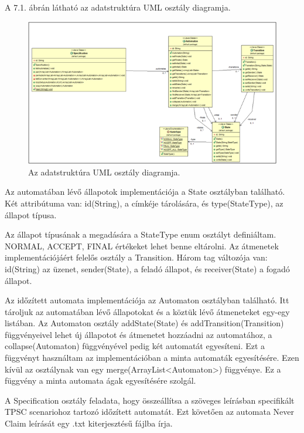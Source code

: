 A 7.1. ábrán látható az adatstruktúra UML osztály diagramja.

\begin{figure}[h!]
    \centering
    \includegraphics[width=150mm, keepaspectratio]{figures/13abra.png}
    \caption{Az adatstruktúra UML osztály diagramja.}
\end{figure}

Az automatában lévő állapotok implementációja a State osztályban található.
Két attribútuma van: id(String), a címkéje tárolására, és type(StateType), az állapot típusa.

Az állapot típusának a megadására a StateType enum osztályt definiáltam.
NORMAL, ACCEPT, FINAL értékeket lehet benne eltárolni.
Az átmenetek implementációjáért felelős osztály a Transition.
Három tag változója van: id(String) az üzenet, sender(State), a feladó állapot, és receiver(State) a fogadó állapot.

Az időzített automata implementációja az Automaton osztályban található.
Itt tároljuk az automatában lévő állapotokat és a köztük lévő átmeneteket egy-egy listában.
Az Automaton osztály addState(State) és addTransition(Transition) függvényeivel lehet új állapotot és átmenetet hozzáadni az automatához, a collapse(Automaton) függvényével pedig két automatát egyesíteni.
Ezt a függvényt használtam az implementációban a minta automaták egyesítésére.
Ezen kívül az osztálynak van egy merge(ArrayList<Automaton>) függvénye.
Ez a függvény a minta automata ágak egyesítésére szolgál.

A Specification osztály feladata, hogy összeállítsa a szöveges leírásban specifikált TPSC scenariohoz tartozó időzített automatát.
Ezt követően az automata Never Claim leírását egy .txt kiterjesztésű fájlba írja.

